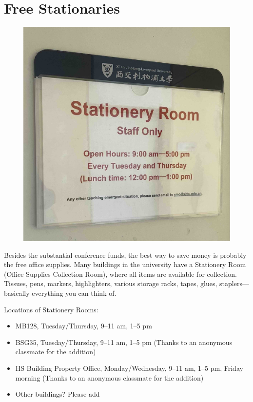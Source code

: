 \section{Free Stationaries}
\begin{figure}[H]
    \centering
    \includegraphics[width=0.6\columnwidth]{author-folder/Kai.Wu/stationery_room.jpg}
\end{figure}

Besides the substantial conference funds, the best way to save money is probably the free office supplies. Many buildings in the university have a Stationery Room (Office Supplies Collection Room), where all items are available for collection. Tissues, pens, markers, highlighters, various storage racks, tapes, glues, staplers—basically everything you can think of.

\vspace{5mm}
Locations of Stationery Rooms:
\begin{itemize}
    \item MB128, Tuesday/Thursday, 9–11 am, 1–5 pm
    \item BSG35, Tuesday/Thursday, 9–11 am, 1–5 pm (Thanks to an anonymous classmate for the addition)
    \item HS Building Property Office, Monday/Wednesday, 9–11 am, 1–5 pm, Friday morning (Thanks to an anonymous classmate for the addition)
    \item Other buildings? Please add
\end{itemize}

